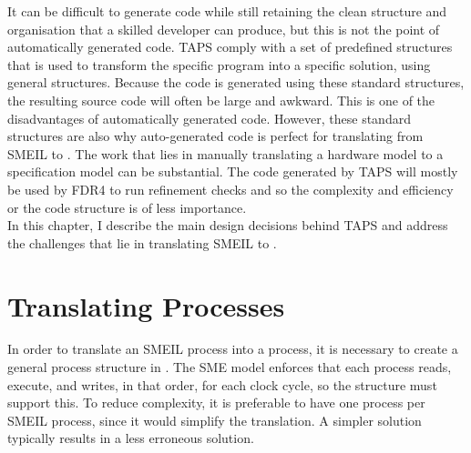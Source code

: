 It can be difficult to generate code while still retaining the clean structure and organisation that a skilled developer can produce, but this is not the point of automatically generated code. TAPS comply with a set of predefined structures that is used to transform the specific program into a specific solution, using general structures. Because the code is generated using these standard structures, the resulting source code will often be large and awkward. This is one of the disadvantages of automatically generated code. However, these standard structures are also why auto-generated code is perfect for translating from SMEIL to \cspm{}. The work that lies in manually translating a hardware model to a specification model can be substantial. The code generated by TAPS will mostly be used by FDR4 to run refinement checks and so the complexity and efficiency or the code structure is of less importance.\\

In this chapter, I describe the main design decisions behind TAPS and address the challenges that lie in translating SMEIL to \cspm{}.
\section{Translating Processes}
In order to translate an SMEIL process into a \cspm{} process, it is necessary to create a general process structure in \cspm{}. The SME model enforces that each process reads, execute, and writes, in that order, for each clock cycle, so the \cspm{} structure must support this. To reduce complexity, it is preferable to have one \cspm{} process per SMEIL process, since it would simplify the translation. A simpler solution typically results in a less erroneous solution.\\

